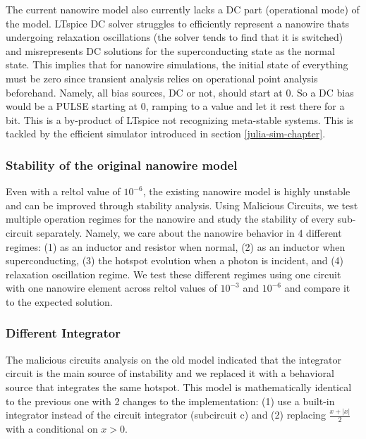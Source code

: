 \documentclass[]{article}
\newcommand{\todoexplain}[2][]{}
\newcommand{\cf}[1]{\textsf{#1}}
\begin{document}
The current nanowire model also currently lacks a DC part (operational mode) 
of the model.
LTspice DC solver struggles to efficiently represent a nanowire thats
undergoing relaxation oscillations (the solver tends to find that it is
switched) and misrepresents DC solutions for the superconducting state
as the normal state. This implies that for nanowire simulations,
the initial state of everything must be zero since transient analysis relies
on operational point analysis beforehand. Namely, all bias sources,
DC or not, should start at $0$. So a DC bias would be a \cf{PULSE} starting
at 0, ramping to a value and let it rest there for a bit. This is a by-product 
of LTspice not recognizing meta-stable systems. This is tackled by the efficient 
simulator introduced in section \ref{julia-sim-chapter}.

\subsubsection{Stability of the original nanowire model}

Even with a \cf{reltol} value of $10^{-6}$, the existing nanowire model is highly unstable
and can be improved through stability analysis.
Using Malicious Circuits, we test multiple operation regimes for
the nanowire and study the stability of every sub-circuit separately. Namely,
we care about the nanowire behavior in 4 different regimes: 
(1) as an inductor and resistor when normal, 
(2) as an inductor when superconducting, (3) the hotspot evolution when a photon is
incident, and (4) relaxation oscillation regime. We test these different regimes 
using one circuit with one nanowire element across \cf{reltol} values of $10^{-3}$
and $10^{-6}$ and compare it to the expected solution.

\todoexplain[]{continue paragraph}

\subsubsection{Different Integrator}

The malicious circuits analysis on the old model indicated
that the integrator circuit is the main source of instability
and we replaced it with a behavioral source that integrates the same hotspot.
This model is mathematically identical to the previous one with 2 changes
to the implementation: (1) use a built-in integrator instead of the circuit
integrator (subcircuit c) and (2) replacing $\frac{x+|x|}{2}$ with a conditional
on $x>0$.
\end{document}

